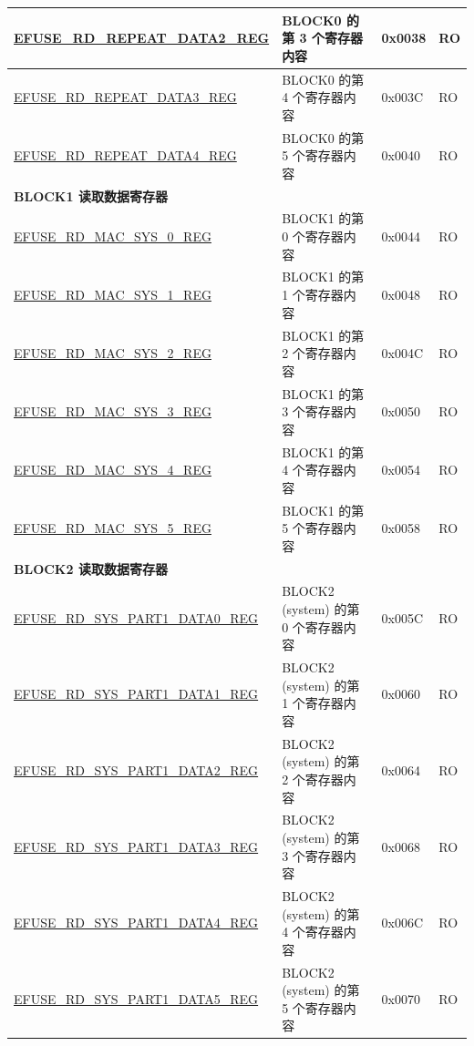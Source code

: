 \begin{longtable}{ | p{7cm} | p{7.2cm} | p{1.3cm} | p{1cm} | }
\hyperref[regdesc:EFUSERDREPEATDATA2REG]{EFUSE\_RD\_REPEAT\_DATA2\_REG} & BLOCK0 的第 3 个寄存器内容 & 0x0038 & RO \\ \hline
\hyperref[regdesc:EFUSERDREPEATDATA3REG]{EFUSE\_RD\_REPEAT\_DATA3\_REG} & BLOCK0 的第 4 个寄存器内容 & 0x003C & RO \\ \hline
\hyperref[regdesc:EFUSERDREPEATDATA4REG]{EFUSE\_RD\_REPEAT\_DATA4\_REG} & BLOCK0 的第 5 个寄存器内容 & 0x0040 & RO \\ \hline
\multicolumn{4}{|l|}{\textbf{BLOCK1 读取数据寄存器}} \\ \hline
\hyperref[regdesc:EFUSERDMACSYS0REG]{EFUSE\_RD\_MAC\_SYS\_0\_REG} & BLOCK1 的第 0 个寄存器内容 & 0x0044 & RO \\ \hline
\hyperref[regdesc:EFUSERDMACSYS1REG]{EFUSE\_RD\_MAC\_SYS\_1\_REG} & BLOCK1 的第 1 个寄存器内容 & 0x0048 & RO \\ \hline
\hyperref[regdesc:EFUSERDMACSYS2REG]{EFUSE\_RD\_MAC\_SYS\_2\_REG} & BLOCK1 的第 2 个寄存器内容 & 0x004C & RO \\ \hline
\hyperref[regdesc:EFUSERDMACSYS3REG]{EFUSE\_RD\_MAC\_SYS\_3\_REG} & BLOCK1 的第 3 个寄存器内容 & 0x0050 & RO \\ \hline
\hyperref[regdesc:EFUSERDMACSYS4REG]{EFUSE\_RD\_MAC\_SYS\_4\_REG} & BLOCK1 的第 4 个寄存器内容 & 0x0054 & RO \\ \hline
\hyperref[regdesc:EFUSERDMACSYS5REG]{EFUSE\_RD\_MAC\_SYS\_5\_REG} & BLOCK1 的第 5 个寄存器内容 & 0x0058 & RO \\ \hline
\multicolumn{4}{|l|}{\textbf{BLOCK2 读取数据寄存器}} \\ \hline
\hyperref[regdesc:EFUSERDSYSPART1DATANREG]{EFUSE\_RD\_SYS\_PART1\_DATA0\_REG} & BLOCK2 (system) 的第 0 个寄存器内容 & 0x005C & RO \\ \hline
\hyperref[regdesc:EFUSERDSYSPART1DATANREG]{EFUSE\_RD\_SYS\_PART1\_DATA1\_REG} & BLOCK2 (system) 的第 1 个寄存器内容 & 0x0060 & RO \\ \hline
\hyperref[regdesc:EFUSERDSYSPART1DATANREG]{EFUSE\_RD\_SYS\_PART1\_DATA2\_REG} & BLOCK2 (system) 的第 2 个寄存器内容 & 0x0064 & RO \\ \hline
\hyperref[regdesc:EFUSERDSYSPART1DATANREG]{EFUSE\_RD\_SYS\_PART1\_DATA3\_REG} & BLOCK2 (system) 的第 3 个寄存器内容 & 0x0068 & RO \\ \hline
\hyperref[regdesc:EFUSERDSYSPART1DATANREG]{EFUSE\_RD\_SYS\_PART1\_DATA4\_REG} & BLOCK2 (system) 的第 4 个寄存器内容 & 0x006C & RO \\ \hline
\hyperref[regdesc:EFUSERDSYSPART1DATANREG]{EFUSE\_RD\_SYS\_PART1\_DATA5\_REG} & BLOCK2 (system) 的第 5 个寄存器内容 & 0x0070 & RO \\ \hline

\end{longtable}
